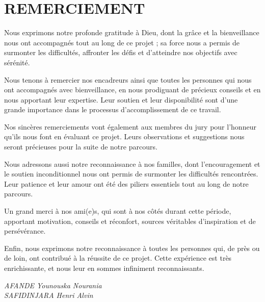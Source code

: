\chapter*{REMERCIEMENT}
\thispagestyle{plain}

Nous exprimons notre profonde gratitude à Dieu, dont la grâce et la bienveillance nous ont accompagnés tout au long de ce projet ; sa force nous a permis de surmonter les difficultés, affronter les défis et d'atteindre nos objectifs avec sérénité.

Nous tenons à remercier nos encadreurs ainsi que toutes les personnes qui nous ont accompagnés avec bienveillance, en nous prodiguant de précieux conseils et en nous apportant leur expertise. Leur soutien et leur disponibilité sont d'une grande importance dans le processus d'accomplissement de ce travail.

Nos sincères remerciements vont également aux membres du jury pour l'honneur qu'ils nous font en évaluant ce projet. Leurs observations et suggestions nous seront précieuses pour la suite de notre parcours.

Nous adressons aussi notre reconnaissance à nos familles, dont l'encouragement et le soutien inconditionnel nous ont permis de surmonter les difficultés rencontrées. Leur patience et leur amour ont été des piliers essentiels tout au long de notre parcours.

Un grand merci à nos ami(e)s, qui sont à nos côtés durant cette période, apportant motivation, conseils et réconfort, sources véritables d'inspiration et de persévérance.

Enfin, nous exprimons notre reconnaissance à toutes les personnes qui, de près ou de loin, ont contribué à la réussite de ce projet. Cette expérience est très enrichissante, et nous leur en sommes infiniment reconnaissants.

\vspace{1.2cm}
\begin{flushright}
\textit{AFANDE Younouska Nourania}\\
\textit{SAFIDINJARA Henri Alvin}
\end{flushright}

